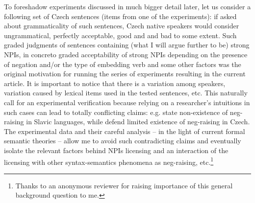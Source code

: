 \documentclass[output=paper,
]{langscibook}
\begin{document}
To foreshadow experiments discussed in much bigger detail later, let us consider a following set of Czech sentences (items from one of the experiments): if asked about grammaticality of such sentences, Czech native speakers would consider  ungrammatical,  perfectly acceptable,  good and  and  bad to some extent. Such graded judgments of sentences containing (what I will argue further to be) strong NPIs, in concreto graded acceptability of strong NPIs depending on the presence of negation and/or the type of embedding verb and some other factors was the original motivation for running the series of experiments resulting in the current article. It is important to notice that there is a variation among speakers, variation caused by lexical items used in the tested sentences, etc. This naturally call for an experimental verification because relying on a researcher's intuitions in such cases can lead to totally conflicting claims: e.g. \cite{Boskovic2011} state non-existence of neg-raising in Slavic languages, while \cite{dovcekal2016experimentala} defend limited existence of neg-raising in Czech. The experimental data and their careful analysis -- in the light of current formal semantic theories -- allow me to avoid such contradicting claims and eventually isolate the relevant factors behind NPIs licensing and an interaction of the licensing with other syntax-semantics phenomena as neg-raising, etc.\footnote{Thanks to an anonymous reviewer for raising importance of this general background question to me.}

\ea \label{ex-2-5} 

\z
\z
\end{document}
